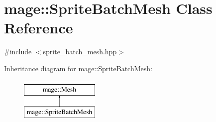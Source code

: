 \hypertarget{classmage_1_1_sprite_batch_mesh}{}\section{mage\+:\+:Sprite\+Batch\+Mesh Class Reference}
\label{classmage_1_1_sprite_batch_mesh}


{\ttfamily \#include $<$sprite\+\_\+batch\+\_\+mesh.\+hpp$>$}

Inheritance diagram for mage\+:\+:Sprite\+Batch\+Mesh\+:\begin{figure}[H]
\begin{center}
\leavevmode
\includegraphics[height=2.000000cm]{classmage_1_1_sprite_batch_mesh}
\end{center}
\end{figure}
